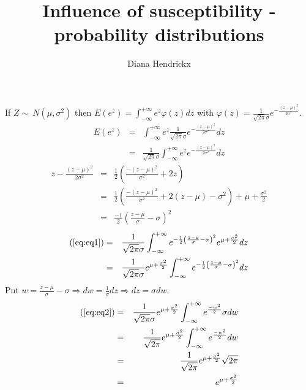 \documentclass[a4paper]{article}
\begin{document}
\title{Influence of susceptibility - probability distributions}
\author{Diana Hendrickx}
\maketitle
If $Z \sim\ N\left(\mu, \sigma^{2}\right)$ then $E\left(e^{z}\right) = \int^{+\infty}_{-\infty} e^{z} \varphi\left(z\right) dz$ with $\varphi\left(z\right) = \frac{1}{\sqrt{2\pi}\sigma}e^{-\frac{\left(z-\mu\right)^{2}}{2 \sigma^{2}}}$.
\begin{eqnarray}
E\left(e^{z}\right) &=& \int^{+\infty}_{-\infty} e^{z} \frac{1}{\sqrt{2\pi}\sigma}e^{-\frac{\left(z-\mu\right)^{2}}{2 \sigma^{2}}} dz \nonumber \\
&=& \frac{1}{\sqrt{2\pi}\sigma} \int^{+\infty}_{-\infty} e^{z} e^{-\frac{\left(z-\mu\right)^{2}}{2 \sigma^{2}}} dz \label{eq:eq1}
\end{eqnarray} 
\begin{eqnarray}
z - \frac{\left(z-\mu\right)^{2}}{2 \sigma^{2}} & = & \frac{1}{2}\left(\frac{-\left(z-\mu\right)^{2}}{\sigma^{2}} + 2z\right) \nonumber \\
&=& \frac{1}{2}\left(\frac{-\left(z-\mu\right)^{2}}{\sigma^{2}} + 2\left(z-\mu\right)-\sigma^2\right) + \mu + \frac{\sigma^2}{2} \nonumber \\
&=& \frac{-1}{2}\left(\frac{z-\mu}{\sigma} - \sigma\right)^{2} \nonumber
\end{eqnarray}
\begin{eqnarray}
\left(\ref{eq:eq1}\right) &=& \frac{1}{\sqrt{2\pi}\sigma} \int^{+\infty}_{-\infty} e^{-\frac{1}{2}\left(\frac{z-\mu}{\sigma} - \sigma\right)^{2}} e^{\mu + \frac{\sigma^2}{2}} dz \nonumber \\
&=& \frac{1}{\sqrt{2\pi}\sigma} e^{\mu + \frac{\sigma^2}{2}} \int^{+\infty}_{-\infty} e^{-\frac{1}{2}\left(\frac{z-\mu}{\sigma} - \sigma\right)^{2}} dz \label{eq:eq2}
\end{eqnarray}
Put $w = \frac{z-\mu}{\sigma} - \sigma \Rightarrow dw = \frac{1}{\sigma} dz \Rightarrow dz = \sigma dw$.
\begin{eqnarray}
\left(\ref{eq:eq2}\right) &=& \frac{1}{\sqrt{2\pi}\sigma} e^{\mu + \frac{\sigma^2}{2}} \int^{+\infty}_{-\infty} e^{\frac{-w^{2}}{2}} \sigma dw \nonumber \\
&=& \frac{1}{\sqrt{2\pi}}e^{\mu + \frac{\sigma^2}{2}} \int^{+\infty}_{-\infty} e^{\frac{-w^{2}}{2}} dw \nonumber \\
&=& \frac{1}{\sqrt{2\pi}}e^{\mu + \frac{\sigma^2}{2}} \sqrt{2\pi} \nonumber \\
&=& e^{\mu + \frac{\sigma^2}{2}} \nonumber
\end{eqnarray}
\end{document}
